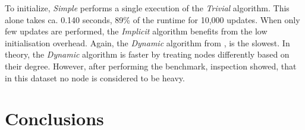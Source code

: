 \documentclass[letterpaper,12pt]{article}
\begin{document}
To initialize, \textit{Simple} performs a single execution of the
\textit{Trivial} algorithm. This alone takes ca. 0.140 seconds, 89\% of the
runtime for 10,000 updates.
When only few updates are performed, the \textit{Implicit} algorithm benefits
from the low initialisation overhead.
Again, the \textit{Dynamic} algorithm from \cite{gupta2018simple}, is the slowest.
In theory, the \textit{Dynamic} algorithm is faster by treating nodes
differently based on their degree. However, after performing the benchmark, inspection
showed, that in this dataset no node is considered to be heavy.





\section{Conclusions}

{}

\end{document}
